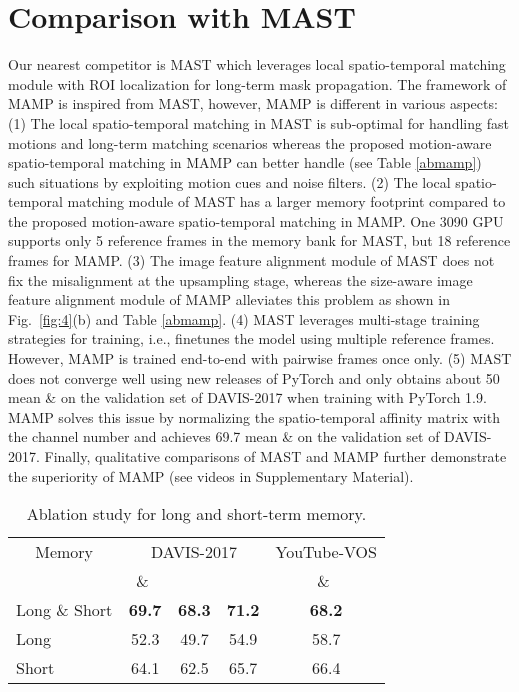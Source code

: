 \documentclass[letterpaper]{article} \usepackage{aaai22}  \usepackage{times}  \usepackage{helvet}  \usepackage{courier}  \usepackage[hyphens]{url}  \usepackage{graphicx} \urlstyle{rm} \def\UrlFont{\rm}  \usepackage{natbib}  \usepackage{caption} \DeclareCaptionStyle{ruled}{labelfont=normalfont,labelsep=colon,strut=off} \frenchspacing  \setlength{\pdfpagewidth}{8.5in}  \setlength{\pdfpageheight}{11in}  \usepackage{algorithm}
\begin{document}
\section{Comparison with MAST}
Our nearest competitor is MAST \cite{MAST} which leverages local spatio-temporal matching module with ROI localization for long-term mask propagation. The framework of MAMP is inspired from MAST, however, MAMP is different in various aspects: (1) The local spatio-temporal matching in MAST is sub-optimal for handling fast motions and long-term matching scenarios whereas the proposed motion-aware spatio-temporal matching in MAMP can better handle (see Table \ref{abmamp}) such situations by exploiting motion cues and noise filters. (2) The local spatio-temporal matching module of MAST has a larger memory footprint compared to the proposed motion-aware spatio-temporal matching in MAMP. One 3090 GPU supports only 5 reference frames in the memory bank for MAST, but 18 reference frames for MAMP. (3) The image feature alignment module of MAST does not fix the misalignment at the upsampling stage, whereas the size-aware image feature alignment module of MAMP alleviates this problem as shown in Fig.~\ref{fig:4}(b) and Table \ref{abmamp}. (4) MAST leverages multi-stage training strategies for training, i.e., finetunes the model using multiple reference frames. However, MAMP is trained end-to-end with pairwise frames once only. (5) MAST does not converge well using new releases of PyTorch and only obtains about 50 mean \& on the validation set of DAVIS-2017 when training with PyTorch 1.9. MAMP solves this issue by normalizing the spatio-temporal affinity matrix with the channel number and achieves 69.7 mean \& on the validation set of DAVIS-2017. Finally, qualitative comparisons of MAST and MAMP further demonstrate the superiority of MAMP (see videos in Supplementary Material).


\begin{table}[t]
\small
\centering
\begin{tabular}{lcccc}
\toprule[1.5pt]
\multicolumn{1}{c}{Memory} & \multicolumn{3}{c}{DAVIS-2017} & \multicolumn{1}{c}{YouTube-VOS}\\
\cmidrule(lr){2-4}\cmidrule(lr){5-5} & \ \& \ & \ & \ & \ \& \ \\
\hline
Long \& Short & \textbf{69.7} & \textbf{68.3} & \textbf{71.2} & \textbf{68.2} \\
\hline
Long & 52.3 & 49.7 & 54.9 & 58.7 \\
Short & 64.1 & 62.5 & 65.7 & 66.4 \\
\toprule[1.5pt]
\end{tabular}
\caption{Ablation study for long and short-term memory.}
\label{abmem}
\end{table}
\end{document}
